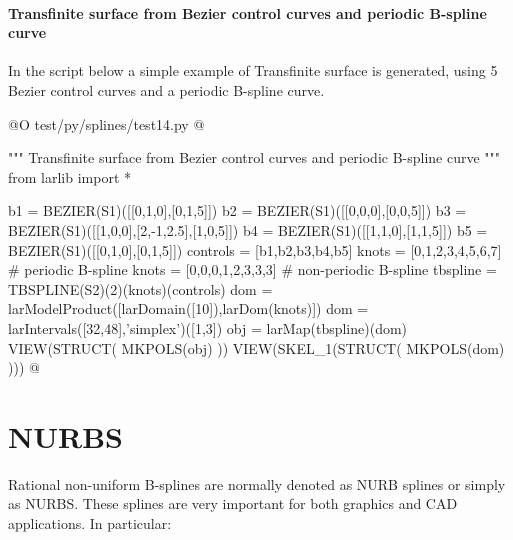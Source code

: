 \documentclass[11pt,oneside]{article}	%
\begin{document}
\paragraph{Transfinite surface from Bezier control curves and periodic B-spline curve}

In the script below a simple example of Transfinite surface is generated, using 5
Bezier control curves and a periodic B-spline curve.

@O test/py/splines/test14.py
@{""" Transfinite surface from Bezier control curves and periodic B-spline curve """
from larlib import *

b1 = BEZIER(S1)([[0,1,0],[0,1,5]])
b2 = BEZIER(S1)([[0,0,0],[0,0,5]])
b3 = BEZIER(S1)([[1,0,0],[2,-1,2.5],[1,0,5]])
b4 = BEZIER(S1)([[1,1,0],[1,1,5]])
b5 = BEZIER(S1)([[0,1,0],[0,1,5]])
controls = [b1,b2,b3,b4,b5]
knots = [0,1,2,3,4,5,6,7]				# periodic B-spline
knots = [0,0,0,1,2,3,3,3]				# non-periodic B-spline
tbspline = TBSPLINE(S2)(2)(knots)(controls) 	
dom = larModelProduct([larDomain([10]),larDom(knots)])
dom = larIntervals([32,48],'simplex')([1,3])
obj = larMap(tbspline)(dom)
VIEW(STRUCT( MKPOLS(obj) ))
VIEW(SKEL_1(STRUCT( MKPOLS(dom) )))
@}



\section{NURBS}


Rational non-uniform B-splines are normally denoted as NURB splines or
simply as NURBS. These splines are very important for both graphics
and CAD applications. In particular:
\end{document}
